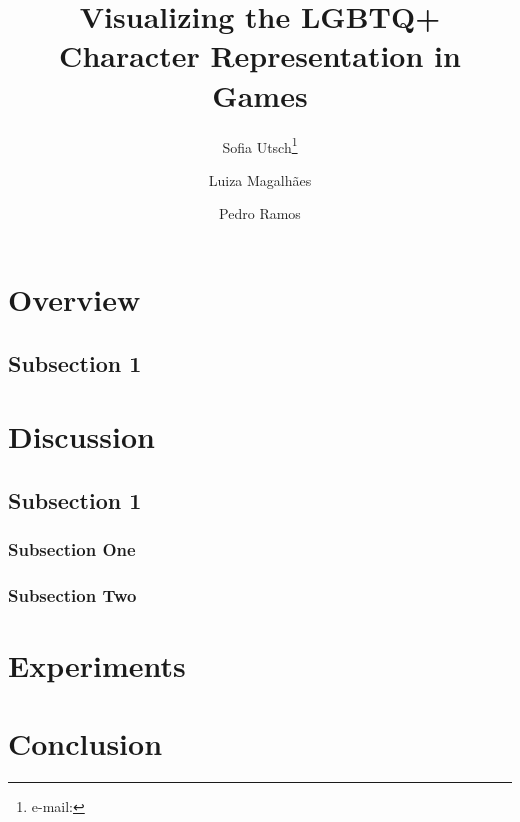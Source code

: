 \documentclass{vgtc}                          %
\title{Visualizing the LGBTQ+ Character Representation in Games}
\author{Sofia Utsch\thanks{e-mail: } %
\and Luiza Magalh\~aes %
\and Pedro Ramos %
}
\affiliation{\scriptsize $^{}$Universidade Federal de Minas Gerais\\}
\begin{document}


\maketitle

\section{Overview}

\subsection{Subsection 1}

\section{Discussion}

\subsection{Subsection 1}

\subsubsection{Subsection One}

\subsubsection{Subsection Two}

\section{Experiments}

\section{Conclusion}



\end{document}
